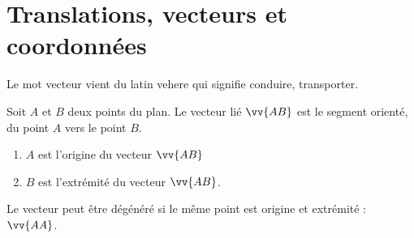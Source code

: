 \documentclass[main.tex]{subfiles}
\begin{document}
\section{Translations, vecteurs et coordonnées}
Le mot \og  vecteur \fg{} vient du latin \og vehere \fg{} qui signifie conduire, transporter.
\begin{definition} Soit $A$ et $B$ deux points du plan.  
	Le vecteur lié  $\vv{AB}$ est le segment orienté, du point $A$ vers le point $B$. 
	\begin{enumerate}[label=\textbullet]
		\item $A$ est l'origine du vecteur  $\vv{AB}$
		\item $B$ est l'extrémité du vecteur   $\vv{AB}$.
	\end{enumerate}
	Le vecteur peut être dégénéré si le même point est origine et extrémité : $\vv{AA}$.
\end{definition}
\end{document}
